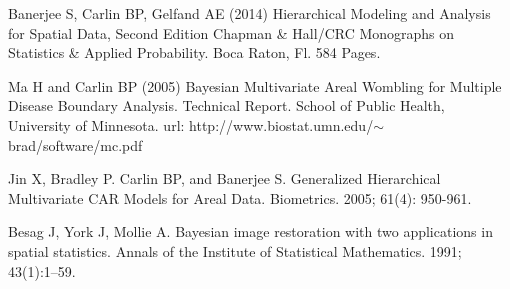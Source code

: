 \documentclass[10pt,letterpaper]{article}
\begin{document}
\begin{thebibliography}{99}
	
	
	
	Banerjee S, Carlin BP,  Gelfand AE (2014)
	Hierarchical Modeling and Analysis for Spatial Data, Second Edition
	Chapman \& Hall/CRC Monographs on Statistics \& Applied Probability. Boca Raton, Fl.
	584 Pages.
	
	Ma H and Carlin BP (2005)
	Bayesian Multivariate Areal Wombling for Multiple Disease Boundary Analysis. Technical Report. School of Public Health, University of Minnesota. url: http://www.biostat.umn.edu/$\sim$brad/software/mc.pdf
	
	Jin X, Bradley P. Carlin BP, and Banerjee S. 
	Generalized Hierarchical Multivariate CAR Models for Areal Data.  
	Biometrics. 2005; 61(4): 950-961.
	
	Besag  J, York  J, Mollie  A.
	Bayesian image restoration with two applications in spatial statistics.
	Annals of the Institute of Statistical Mathematics. 1991; 43(1):1--59.
	
	
	
\end{thebibliography}
\end{document}
